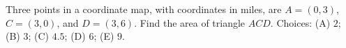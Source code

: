 Three points in a coordinate map, with coordinates in miles, are $A=(0,3)$, $C=(3,0)$, and $D=(3,6)$. Find the area of triangle $ACD$. Choices: (A) $2$; (B) $3$; (C) $4.5$; (D) $6$; (E) $9$.
